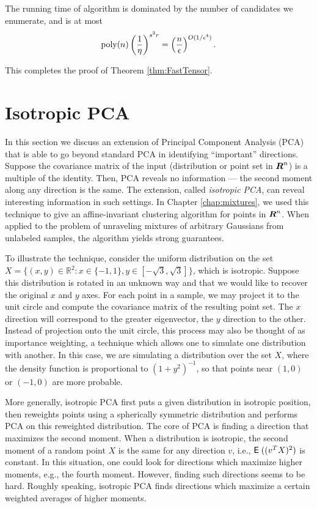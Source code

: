 \documentclass{book}
\numberwithin{exercise}{chapter}
\begin{document}
The running time of algorithm is dominated by the number of candidates we
enumerate, and is at most
\[
\mbox{poly}(n)\left(\frac{1}{\eta}\right)^{s^2r} = \left(\frac{n}{\epsilon}\right)^{O(1/\epsilon^4)}.
\]

This completes the proof of Theorem \ref{thm:FastTensor}.

\section{Isotropic PCA}

In this section we discuss an extension of Principal Component Analysis (PCA) that
is able to go beyond standard PCA in identifying ``important''
directions. Suppose the covariance matrix of the input (distribution or
point set in $\mbox{\mbox{\boldmath $R$}}^n$) is a multiple of the identity. Then, PCA reveals
no information --- the second moment along any direction is the
same. The extension, called
{\em isotropic PCA}, can reveal interesting information in such
settings. In Chapter \ref{chap:mixtures}, we used this technique to give an affine-invariant clustering
algorithm for points in $\mbox{\mbox{\boldmath $R$}}^n$. When applied to the problem of
unraveling mixtures of arbitrary Gaussians from unlabeled samples, the
algorithm yields strong guarantees.

To illustrate the technique, consider the uniform distribution on the
set $X = \{(x,y) \in \mathbb{R}^2 : x \in \{-1,1\}, y \in
[-\sqrt{3},\sqrt{3}]\}$, which is isotropic.  Suppose this
distribution is rotated in an unknown way and that we would like to
recover the original $x$ and $y$ axes.  For each point in a sample, we
may project it to the unit circle and compute the covariance matrix of
the resulting point set.  The $x$ direction will correspond to the
greater eigenvector, the $y$ direction to the other.
Instead of projection onto the
unit circle, this process may also be thought of as importance
weighting, a technique which allows one to simulate one distribution
with another.  In this case, we are simulating a distribution over the
set $X$, where the density function is proportional to $(1 +
y^2)^{-1}$, so that points near $(1,0)$ or $(-1,0)$ are more probable.

More generally, isotropic PCA first puts a given distribution in isotropic position, then reweights points using a spherically symmetric distribution and performs PCA on this reweighted distribution.
The core of PCA is finding a direction that maximizes the second moment.
When a distribution is isotropic, the second moment of a random point $X$ is the same for any direction $v$, i.e., $\hbox{{\sf E}\;}((v^TX)^2)$ is constant. In this situation, one could look for directions which maximize higher moments, e.g., the fourth moment. However, finding such directions seems to be hard. Roughly speaking, isotropic PCA finds directions which maximize a certain weighted averages of higher moments.
\end{document}
